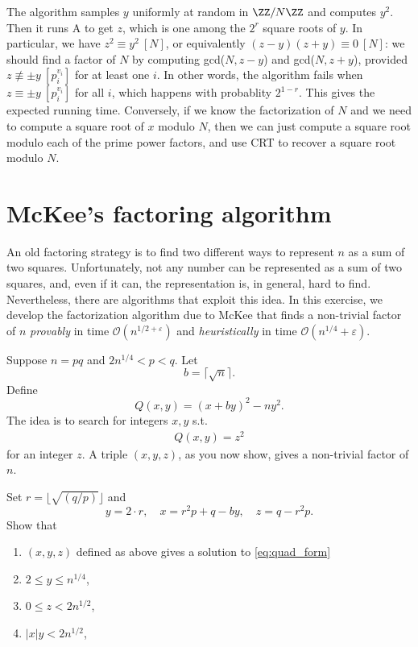 \documentclass[11pt]{exam}
\theoremstyle{definition}
\begin{document}
{\begin{questions}
    \begin{solution}
      The algorithm samples $y$ uniformly at random in $\ZZ/N\ZZ$ and computes $y^2$. Then it runs {\sc A} to get $z$, which is one among the $2^r$ square roots of $y$. In particular, we have $z^2 \equiv y^2~[N]$, or equivalently $(z-y)(z+y)\equiv 0~[N]$: we should find a factor of $N$ by computing gcd($N, z-y$) and gcd($N, z+y$), provided $z\not\equiv \pm y~[p_i^{v_i}]$ for at least one $i$. In other words, the algorithm fails when $z\equiv \pm y~[p_i^{v_i}]$ for all $i$, which happens with probablity $2^{1-r}$. This gives the expected running time. Conversely, if we know the factorization of $N$ and we need to compute a square root of $x$ modulo $N$, then we can just compute a square root modulo each of the prime power factors, and use CRT to recover a square root modulo $N$.
      
    \end{solution}

  
\end{questions}

\section{McKee's factoring algorithm}

An old factoring strategy is to find two different ways to represent $n$ as a sum of two squares. Unfortunately, not any number can be represented as a sum of two squares, and, even if it can, the representation is, in general, hard to find. Nevertheless, there are algorithms that exploit this idea. In this exercise, we develop the factorization algorithm due to McKee that finds a non-trivial factor of $n$ \emph{provably} in time $\mathcal{O}(n^{1/2 + \varepsilon})$ and \emph{heuristically} in time $\mathcal{O}(n^{1/4} + \varepsilon)$.

Suppose $n = pq$ and $2n^{1/4} < p<q$. Let 
\[
	 b = \lceil \sqrt{n} \rceil.
\]
Define
\[
	Q(x,y) = (x+by)^2-ny^2.
\]
The idea is to search for integers $x,y$ s.t.\ 
\begin{align} \label{eq:quad_form}
	Q(x,y) = z^2
\end{align}
for an integer $z$. A triple $(x,y,z)$, as you now show, gives a non-trivial factor of $n$.
\begin{questions}
	\question \label{q:first} Set $r = \lfloor \sqrt{(q/p)} \rfloor$ and 
	\[
		y = 2 \cdot r,  \quad x = r^2p+q - by, \quad z = q-r^2p.
	\]
	Show that 
	\begin{enumerate}
		\item $(x,y,z)$ defined as above gives a solution to \eqref{eq:quad_form}
		\item $2 \leq y \leq n^{1/4}$,
		\item $0 \leq z < 2n^{1/2}$,
		\item $|x|y < 2n^{1/2}$,
		

\end{enumerate}
\end{questions}}
\end{document}

